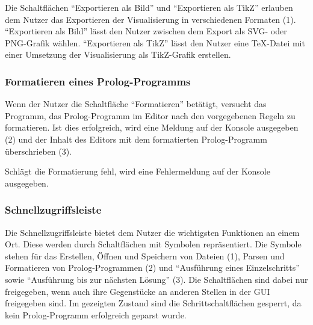 \documentclass[parskip=full,11pt,twoside]{scrartcl}
\begin{document}
\begin{minipage}{\linewidth}
\end{minipage}

Die Schaltflächen \enquote{Exportieren als Bild} und \enquote{Exportieren als TikZ} erlauben dem Nutzer das Exportieren der Visualisierung in verschiedenen Formaten (1).
\enquote{Exportieren als Bild} lässt den Nutzer zwischen dem Export als SVG- oder PNG-Grafik wählen.
\enquote{Exportieren als TikZ} lässt den Nutzer eine TeX-Datei mit einer Umsetzung der Visualisierung als TikZ-Grafik erstellen.

\subsubsection{Formatieren eines Prolog-Programms}

\begin{minipage}{\linewidth}
\end{minipage}

Wenn der Nutzer die Schaltfläche \enquote{Formatieren} betätigt, versucht das Programm, das Prolog-Programm im Editor nach den vorgegebenen Regeln zu formatieren.
Ist dies erfolgreich, wird eine Meldung auf der Konsole ausgegeben (2) und der Inhalt des Editors mit dem formatierten Prolog-Programm überschrieben (3).

Schlägt die Formatierung fehl, wird eine Fehlermeldung auf der Konsole ausgegeben.

\subsubsection{Schnellzugriffsleiste}
\label{gui:schnellzugriff}

\begin{minipage}{\linewidth}
\end{minipage}

Die Schnellzugriffsleiste bietet dem Nutzer die wichtigsten Funktionen an einem Ort.
Diese werden durch Schaltflächen mit Symbolen repräsentiert.
Die Symbole stehen für das Erstellen, Öffnen und Speichern von Dateien (1), Parsen und Formatieren von Prolog-Programmen (2) und \enquote{Ausführung eines Einzelschritts} sowie \enquote{Ausführung bis zur nächsten Lösung} (3).
Die Schaltflächen sind dabei nur freigegeben, wenn auch ihre Gegenstücke an anderen Stellen in der GUI freigegeben sind.
Im gezeigten Zustand sind die Schrittschaltflächen gesperrt, da kein Prolog-Programm erfolgreich geparst wurde.
\end{document}

